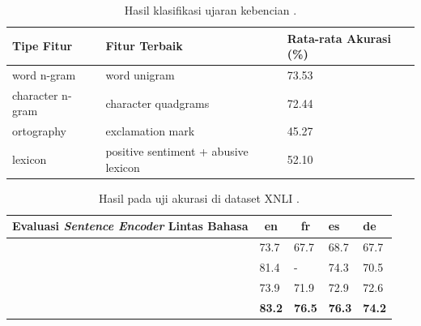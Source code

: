 \begin{table}[hbt]
    \centering
    \caption{Hasil klasifikasi ujaran kebencian \parencite{Ibrohim_Budi_2019}.}
    \begin{tabular}{|l|l|l|}
    \hline
    \textbf{Tipe Fitur} & \textbf{Fitur Terbaik} & \textbf{Rata-rata Akurasi (\%)} \\ \hline
    word n-gram              & word unigram                                    & 73.53                          \\ \hline
    character n-gram         & character quadgrams                             & 72.44                          \\ \hline
    ortography               & exclamation mark                                & 45.27                          \\ \hline
    lexicon                  & positive sentiment + abusive lexicon            & 52.10                          \\ \hline
    \end{tabular}
    \label{tab:Ibrohim_Budi_2019_2}
\end{table}

\begin{table}[!h]
    \centering
    \caption{Hasil pada uji akurasi di dataset XNLI \parencite{LampleConneau2019}.}
    \begin{tabular}{|l|l|l|l|l|}
    \hline
    \multicolumn{1}{|c|}{\textbf{Evaluasi \textit{Sentence Encoder} Lintas Bahasa}} & \multicolumn{1}{c|}{\textbf{en}} & \multicolumn{1}{c|}{\textbf{fr}} & \textbf{es}   & \textbf{de}   \\ \hline
    \parencite{LamplePhrase2018}                            & 73.7                             & 67.7                             & 68.7          & 67.7          \\ \hline
    \parencite{Devlin_Chang_Lee_Toutanova_2019}         & 81.4                             & -                                & 74.3          & 70.5          \\ \hline
    \parencite{Artetxe_Schwenk_2019}                      & 73.9                             & 71.9                             & 72.9          & 72.6          \\ \hline
    \parencite{LampleConneau2019}                           & \textbf{83.2}                    & \textbf{76.5}                    & \textbf{76.3} & \textbf{74.2} \\ \hline
    \end{tabular}
    \label{tab:LampleConneau2019}
\end{table}

